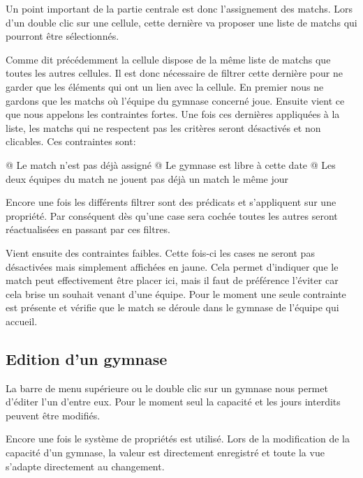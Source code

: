 \documentclass[final, noposter]{polytech/polytech}
\begin{document}
		
		Un point important de la partie centrale est donc l'assignement des matchs.
		Lors d'un double clic sur une cellule, cette dernière va proposer une liste de matchs qui pourront être sélectionnés.
		
		
		Comme dit précédemment la cellule dispose de la même liste de matchs que toutes les autres cellules.
		Il est donc nécessaire de filtrer cette dernière pour ne garder que les éléments qui ont un lien avec la cellule.
		En premier nous ne gardons que les matchs où l'équipe du gymnase concerné joue.
		Ensuite vient ce que nous appelons les contraintes fortes.
		Une fois ces dernières appliquées à la liste, les matchs qui ne respectent pas les critères seront désactivés et non clicables.
		Ces contraintes sont:
		\begin{easylist}[itemize]
			@ Le match n'est pas déjà assigné
			@ Le gymnase est libre à cette date
			@ Les deux équipes du match ne jouent pas déjà un match le même jour
		\end{easylist}
	
		Encore une fois les différents filtrer sont des prédicats et s'appliquent sur une propriété.
		Par conséquent dès qu'une case sera cochée toutes les autres seront réactualisées en passant par ces filtres.
		
		Vient ensuite des contraintes faibles.
		Cette fois-ci les cases ne seront pas désactivées mais simplement affichées en jaune.
		Cela permet d'indiquer que le match peut effectivement être placer ici, mais il faut de préférence l'éviter car cela brise un souhait venant d'une équipe.
		Pour le moment une seule contrainte est présente et vérifie que le match se déroule dans le gymnase de l'équipe qui accueil.
		
		\subsection{Edition d'un gymnase}
			La barre de menu supérieure ou le double clic sur un gymnase nous permet d'éditer l'un d'entre eux.
			Pour le moment seul la capacité et les jours interdits peuvent être modifiés.
			
			
			Encore une fois le système de propriétés est utilisé.
			Lors de la modification de la capacité d'un gymnase, la valeur est directement enregistré et toute la vue s'adapte directement au changement.
			
\end{document}
